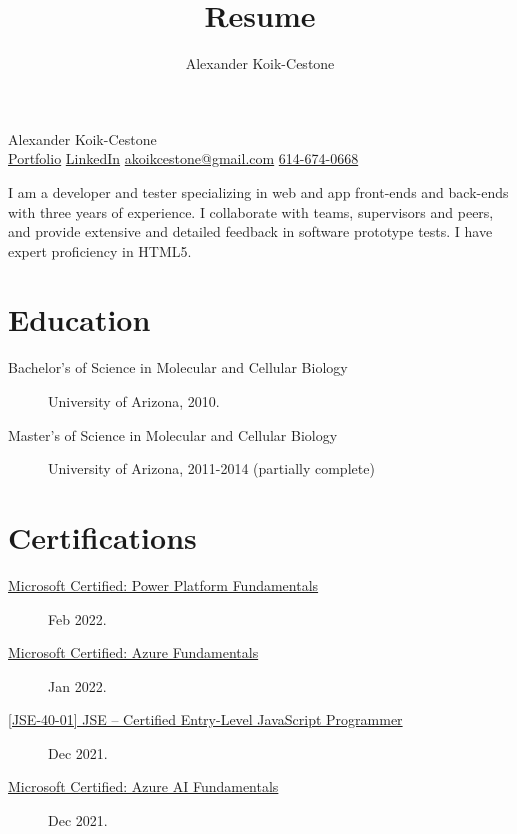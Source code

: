 \documentclass{article}
\author{Alexander Koik-Cestone}
\title{Resume}
\begin{document}
\begin{center}
{\huge Alexander Koik-Cestone\vspace{0.3cm}} \\
\href{https://sirkoik.github.io#portfolio}{Portfolio}
\textcolor{gray}{\textbullet}
\href{https://www.linkedin.com/in/alexander-koik-cestone-89304556/}{LinkedIn}
\textcolor{gray}{\textbullet}
\href{mailto:akoikcestone@gmail.com}{akoikcestone@gmail.com}
\textcolor{gray}{\textbullet}
\href{tel:614-674-0668}{614-674-0668} \\
\end{center}

\noindent
I am a developer and tester specializing in web and app front-ends and back-ends with three years of experience. I collaborate with teams, supervisors and peers, and provide extensive and detailed feedback in software prototype tests. I have expert proficiency in HTML5.

\section*{Education}\vspace{-0.5em}
\begin{description}
  \item[Bachelor's of Science in Molecular and Cellular Biology] University of Arizona, 2010.
  \item[Master's of Science in Molecular and Cellular Biology] University of Arizona, 2011-2014 (partially complete)
\end{description}

\vspace{-1em}
\section*{Certifications}\vspace{-0.5em}
\begin{description}
  \item [\href{https://www.credly.com/badges/eeabb8f3-4c51-431e-9174-1528f4ecd6d3/public_url}{Microsoft Certified: Power Platform Fundamentals}] Feb 2022.
  \item [\href{https://www.credly.com/badges/56339905-a587-4fdb-9906-c2d2bb5d31da/public_url}{Microsoft Certified: Azure Fundamentals}] Jan 2022.
  \item [\href{https://www.credly.com/badges/e75210e4-8d08-43ea-af72-ec70ef666eee/public_url}{[JSE-40-01] JSE – Certified Entry-Level JavaScript Programmer}] Dec 2021.
  \item [\href{https://www.credly.com/badges/fa66cf6b-dff5-4f58-9f4e-4b94fc91b7fa/public_url}{Microsoft Certified: Azure AI Fundamentals}] Dec 2021.
\end{description}
\end{document}

